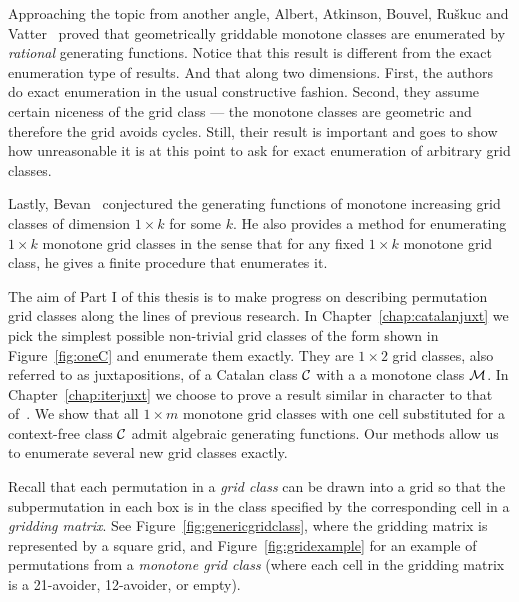 \documentclass[12pt, a4paper, twoside]{report}
\begin{document}
Approaching the topic from another angle, Albert, Atkinson, Bouvel, Ru\v{s}kuc and Vatter~\cite{aabrv2013} proved that geometrically griddable monotone classes are enumerated by \emph{rational} generating functions. Notice that this result is different from the exact enumeration type of results. And that along two dimensions. First, the authors do exact enumeration in the usual constructive fashion. Second, they assume certain niceness of the grid class --- the monotone classes are geometric and therefore the grid avoids cycles. Still, their result is important and goes to show how unreasonable it is at this point to ask for exact enumeration of arbitrary grid classes.

Lastly, Bevan~\cite{bevan2015thesis} conjectured the generating functions of monotone increasing grid classes of dimension $1\times k$ for some $k$. He also provides a method for enumerating $1\times k$ monotone grid classes in the sense that for any fixed $1\times k$ monotone grid class, he gives a finite procedure that enumerates it.

The aim of Part I of this thesis is to make progress on describing permutation grid classes along the lines of previous research. In Chapter~\ref{chap:catalanjuxt} we pick the simplest possible non-trivial grid classes of the form shown in Figure~\ref{fig:oneC} and enumerate them exactly. They are $1\times 2$ grid classes, also referred to as juxtapositions, of a Catalan class $\mathcal{C}$ with a a monotone class $\mathcal{M}$. In Chapter~\ref{chap:iterjuxt} we choose to prove a result similar in character to that of~\cite{aabrv2013}. We show that all $1\times m$ monotone grid classes with one cell substituted for a context-free class $\mathcal{C}$ admit algebraic generating functions. Our methods allow us to enumerate several new grid classes exactly.

Recall that each permutation in a \emph{grid class} can be drawn into a grid so that the subpermutation in each box is in the class specified by the corresponding cell in a \emph{gridding matrix}. See Figure~\ref{fig:genericgridclass}, where the gridding matrix is represented by a square grid, and Figure~\ref{fig:gridexample}  for an example of permutations from a \emph{monotone grid class} (where each cell in the gridding matrix is a 21-avoider, 12-avoider, or empty).

\newsavebox{\smlmata}
\newsavebox{\smlmatb}
\end{document}
